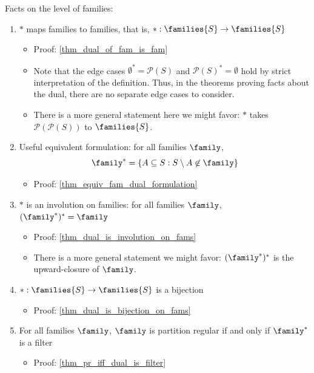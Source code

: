 Facts on the level of families:
\begin{enumerate}
    \item $*$ maps families to families, that is, $*: \families{S} \to \families{S}$
    \begin{itemize}
        \item Proof: \cref{thm_dual_of_fam_is_fam}
        \item Note that the edge cases $\emptyset^* = \mathcal{P}(S)$ and $\mathcal{P}(S)^* = \emptyset$ hold by strict interpretation of the definition.  Thus, in the theorems proving facts about the dual, there are no separate edge cases to consider.
        \item There is a more general statement here we might favor: $*$ takes $\mathcal{P}(\mathcal{P}(S))$ to $\families{S}$.
    \end{itemize}
    
    \item Useful equivalent formulation: for all families $\family$,
    \[\family^* = \{A \subseteq S : S \setminus A \not\in \family\}\]
    \begin{itemize}
        \item Proof: \cref{thm_equiv_fam_dual_formulation}
    \end{itemize}
    
    \item $*$ is an involution on families: for all families $\family$, $(\family^*)^* = \family$
    \begin{itemize}
        \item Proof: \cref{thm_dual_is_involution_on_fams}
        \item There is a more general statement we might favor: $(\family^*)^*$ is the upward-closure of $\family$.
    \end{itemize}

    \item $*: \families{S} \to \families{S}$ is a bijection
    \begin{itemize}
        \item Proof: \cref{thm_dual_is_bijection_on_fams}
    \end{itemize}

    \item For all families $\family$, $\family$ is partition regular if and only if $\family^*$ is a filter
    \begin{itemize}
        \item Proof: \cref{thm_pr_iff_dual_is_filter}
    \end{itemize}
\end{enumerate}

